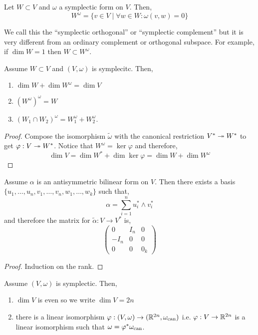 \documentclass[12pt]{article}
\begin{document}
\begin{defn}
Let $W \subset V$ and $\omega$ a symplectic form on $V$. Then,
\[ W^\omega = \{ v \in V \mid \forall w \in W : \omega(v, w) = 0 \} \]
\end{defn}

\begin{rmk}
We call this the ``symplectic orthogonal'' or ``symplectic complement'' but it is very different from an ordinary complement or orthogonal subspace. For example, if $\dim{W} = 1$ then $W \subset W^\omega$.
\end{rmk}

\begin{prop}
Assume $W \subset V$ and $(V, \omega)$ is symplecitc. Then,
\begin{enumerate}
\item $\dim{W} + \dim{W^\omega} = \dim{V}$
\item $(W^\omega)^\omega = W$
\item $(W_1 \cap W_2)^\omega = W_1^\omega + W_2^\omega$.
\end{enumerate}
\end{prop}

\begin{proof}
Compose the isomorphism $\tilde{\omega}$ with the canonical restriction $V^* \twoheadrightarrow W^*$ to get $\varphi : V \twoheadrightarrow W^*$. Notice that $W^\omega = \ker{\varphi}$ and therefore,
\[ \dim{V} = \dim{W^*} + \dim{\ker{\varphi}} = \dim{W} + \dim{W^\omega} \]

\end{proof}

\begin{lemma}
Assume $\alpha$ is an antisymmetric bilinear form on $V$. Then there exists a basis $\{ u_1, \dots, u_n, v_1, \dots, v_n, w_1, \dots, w_k \}$ such that,
\[ \alpha = \sum_{i = 1}^n u_i^* \wedge v_i^* \]
and therefore the matrix for $\tilde{\alpha} : V \to V^*$ is,
\[ 
\begin{pmatrix}
0 & I_n & 0 
\\
- I_n & 0 & 0
\\
0 & 0 & 0_k
\end{pmatrix} \]
\end{lemma}

\begin{proof}
Induction on the rank. 
\end{proof}

\begin{cor}
Assume $(V, \omega)$ is symplectic. Then,
\begin{enumerate}
\item $\dim{V}$ is even so we write $\dim{V} = 2n$
\item there is a linear isomorphism $\varphi : (V, \omega) \to (\mathbb{R}^{2n}, \omega_{\text{can}})$ i.e. $\varphi : V \to \mathbb{R}^{2n}$ is a linear isomorphism such that $\omega = \varphi^* \omega_{\text{can}}$. 
\end{enumerate}
\end{cor}
\end{document}
